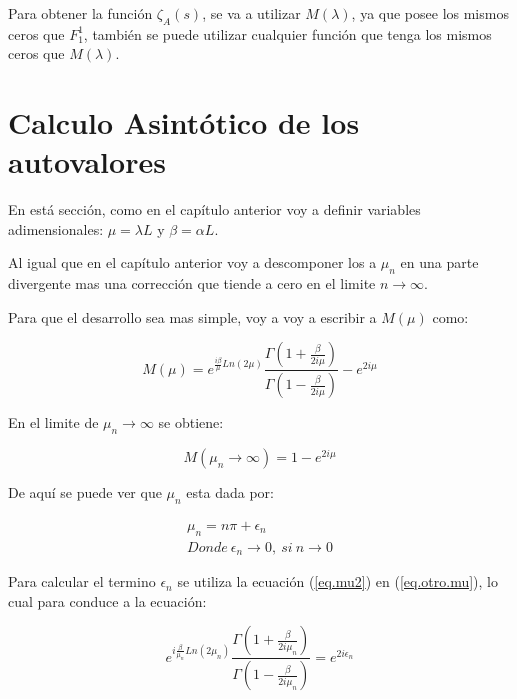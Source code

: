 Para obtener la función $\zeta _A (s) $, se va a utilizar $M( \lambda)$, ya que posee los mismos ceros que $F _1 ^1$, también se puede utilizar cualquier función que tenga los mismos ceros que $M ( \lambda )$.





\section{Calculo Asintótico de los autovalores}


En está sección, como en el capítulo anterior voy a definir variables adimensionales: $\mu = \lambda L $ y $\beta = \alpha L$.

Al igual que en el capítulo anterior voy a descomponer los a $\mu _n$ en una parte divergente mas una corrección que tiende a cero en el limite $n \rightarrow \infty$.

Para que el desarrollo sea mas simple, voy a voy a escribir a $M (\mu)$ como:

\begin{equation}
M (\mu) = e ^{\frac{i \beta }{\mu} Ln(2 \mu) }
\frac{\Gamma (1 + \frac{ \beta}{2 i \mu})}{\Gamma (1 - \frac{ \beta}{2 i \mu})}
- e ^{2 i \mu}
\label{eq.otro.mu}
\end{equation}


En el limite de $\mu _n \rightarrow \infty$ se obtiene:

\begin{equation}
    M(\mu _n \rightarrow \infty) = 
	1 - e ^{2 i \mu}
\end{equation}

De aquí se puede ver que $\mu _n$ esta dada por:


\begin{equation}
\begin{array}{c}
    \mu _n = n \pi + \epsilon _n \\[5pt]
    Donde \ \epsilon _n \rightarrow{0} ,\ si \ n \rightarrow{0}
\end{array}
\label{eq.mu2}
\end{equation}



Para calcular el termino $\epsilon _n$ se utiliza la ecuación (\ref{eq.mu2}) en (\ref{eq.otro.mu}), lo cual para conduce a la ecuación:

\begin{equation}
	e ^{ i \frac{\beta}{ \mu _n} Ln(2 \mu _n)}     
    \frac{\Gamma(1 + \frac{ \beta}{2  i \mu _n} ) }
    {\Gamma(1 -  \frac{ \beta}{2  i \mu _n} )} =    
    e ^{2 i \epsilon _n }
\end{equation}

